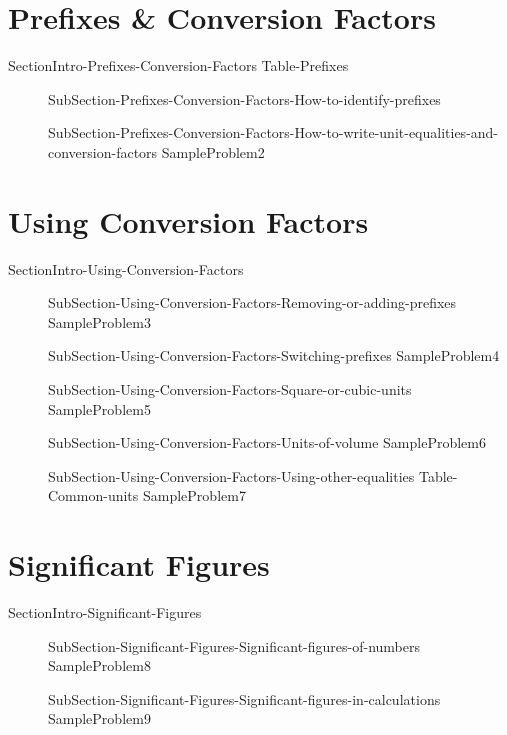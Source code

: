 \documentclass[main.tex]{subfiles}
\begin{document}
\section{Prefixes \& Conversion Factors}
{SectionIntro-Prefixes-Conversion-Factors}
{Table-Prefixes}
\sloppy\begin{description}
\item[]{SubSection-Prefixes-Conversion-Factors-How-to-identify-prefixes}
\item[]{SubSection-Prefixes-Conversion-Factors-How-to-write-unit-equalities-and-conversion-factors}
{SampleProblem2}
\end{description}

\section{Using Conversion Factors}
{SectionIntro-Using-Conversion-Factors}
\sloppy\begin{description}
\item[]{SubSection-Using-Conversion-Factors-Removing-or-adding-prefixes}
{SampleProblem3}
\item[]{SubSection-Using-Conversion-Factors-Switching-prefixes}
{SampleProblem4}
\item[]{SubSection-Using-Conversion-Factors-Square-or-cubic-units}
{SampleProblem5}
\item[]{SubSection-Using-Conversion-Factors-Units-of-volume}
{SampleProblem6}
\item[]{SubSection-Using-Conversion-Factors-Using-other-equalities}
{Table-Common-units}
{SampleProblem7}
\end{description}

\section{Significant Figures}
{SectionIntro-Significant-Figures}
\sloppy\begin{description}
\item[]{SubSection-Significant-Figures-Significant-figures-of-numbers}
{SampleProblem8}
\item[]{SubSection-Significant-Figures-Significant-figures-in-calculations}
{SampleProblem9}
\end{description}
\end{document}
